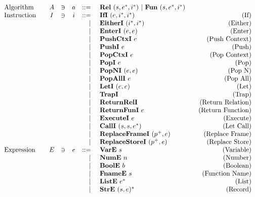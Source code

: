 {
\renewcommand{\arraystretch}{0.8835}  %
\begin{align*}
\begin{array}{lcccrlr}
%
  \text{Algorithm}\quad& A &\ni& a &::=& ~ \rel ~ (s, \seq e, \seq i) ~ | ~ \fun ~ (s, \seq e, \seq i) \\
%
  \text{Instruction}\quad& I &\ni& i &::=& ~ \ifi ~ (e, \seq i, \seq i) &\quad\text{(If)} \\
    &&&& | & ~ \eitheri ~ (\seq i, \seq i) &\quad\text{(Either)} \\
    &&&& | & ~ \enteri ~ (e, e) &\quad\text{(Enter)} \\
    &&&& | & ~ \pushctxi ~ e &\quad\text{(Push Context)} \\
    &&&& | & ~ \pushi ~ e &\quad\text{(Push)} \\
    &&&& | & ~ \popctxi ~ e &\quad\text{(Pop Context)} \\
    &&&& | & ~ \popi ~ e &\quad\text{(Pop)} \\
    &&&& | & ~ \popni ~ (e, e) &\quad\text{(Pop N)} \\
    &&&& | & ~ \popalli ~ e &\quad\text{(Pop All)} \\
    &&&& | & ~ \leti ~ (e, e) &\quad\text{(Let)} \\
    &&&& | & ~ \trapi &\quad\text{(Trap)} \\
    &&&& | & ~ \returnreli &\quad\text{(Return Relation)} \\
    &&&& | & ~ \returnfuni ~ e &\quad\text{(Return Function)} \\
    &&&& | & ~ \executei ~ e &\quad\text{(Execute)} \\
    &&&& | & ~ \calli ~ (s, s, \seq{e}) &\quad\text{(Let Call)} \\
    &&&& | & ~ \replaceframei ~ (p^+, e) &\quad\text{(Replace Frame)} \\
    &&&& | & ~ \replacestorei ~ (p^+, e) &\quad\text{(Replace Store)} \\
%
  \text{Expression}\quad& E &\ni& e &::=& ~ \vare ~ s &\quad\text{(Variable)} \\
    &&&& | & ~ \nume ~ n &\quad\text{(Number)} \\
    &&&& | & ~ \boole ~ b &\quad\text{(Boolean)} \\
    &&&& | & ~ \fnamee ~ s &\quad\text{(Function Name)} \\
    &&&& | & ~ \liste ~ \seq e &\quad\text{(List)} \\
    &&&& | & ~ \stre ~ \seq{(s, e)} &\quad\text{(Record)} \\

\end{array}
\end{align*}}
